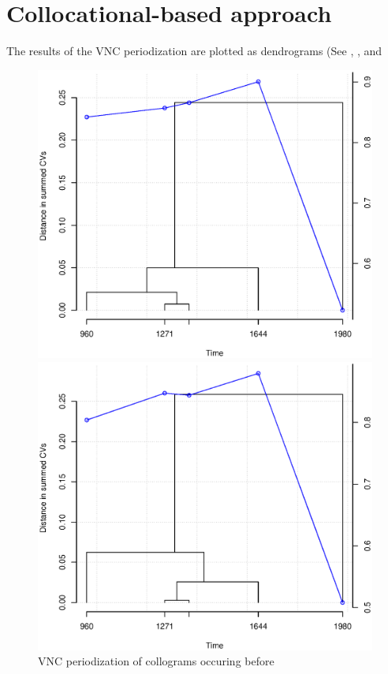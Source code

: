 \section{Collocational-based approach}
The results of the VNC periodization are plotted as dendrograms (See , , and %

\begin{figure}[H]
\centering
\begin{minipage}[b]{0.3\linewidth}
  \includegraphics[width=\textwidth]{figures/pre_VNC_cor.eps}
  \caption{VNC periodization of collograms occuring before \jia}
  \label{fig:pre_VNC}
\end{minipage}
\quad
\begin{minipage}[b]{0.3\linewidth}
  \includegraphics[width=\textwidth]{figures/post_VNC_cor.eps}

\end{minipage}
\end{figure}
